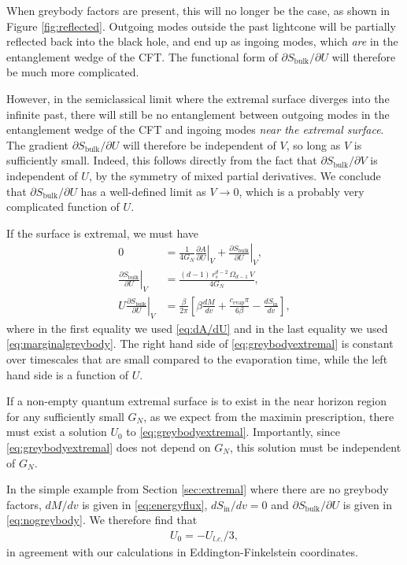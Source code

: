 \documentclass[12pt]{article}
\begin{document}
When greybody factors are present, this will no longer be the case, as shown in Figure \ref{fig:reflected}. Outgoing modes outside the past lightcone will be partially reflected back into the black hole, and end up as ingoing modes, which \emph{are} in the entanglement wedge of the CFT. The functional form of $\partial S_\text{bulk}/\partial U$ will therefore be much more complicated. 

However, in the semiclassical limit where the extremal surface diverges into the infinite past, there will still be no entanglement between outgoing modes in the entanglement wedge of the CFT and ingoing modes \emph{near the extremal surface}. The gradient $\partial S_\text{bulk}/\partial U$ will therefore be independent of $V$, so long as $V$ is sufficiently small. Indeed, this follows directly from the fact that $\partial S_\text{bulk}/\partial V$ is independent of $U$, by the symmetry of mixed partial derivatives. We conclude that $\partial S_\text{bulk}/\partial U$ has a well-defined limit as $V \to 0$, which is a probably very complicated function of $U$.

If the surface is extremal, we must have
\begin{align}
0 &=\frac{1}{4 G_N} \left. \frac{\partial A}{\partial U} \right|_V + \left. \frac{\partial S_\text{bulk}}{\partial U} \right|_V,
\\  \left. \frac{\partial S_\text{bulk}}{\partial U} \right|_V & = \frac{(d-1)\, r_s^{d-2} \,\Omega_{d-1}\, V}{4 G_N},
\\ U \left. \frac{\partial S_\text{bulk}}{\partial U} \right|_V &= \frac{\beta}{2\pi}\left[\beta \frac{d M}{d v} + \frac{c_\text{evap} \pi}{6 \beta} - \frac{d S_\text{in}}{d v}\right], \label{eq:greybodyextremal}
\end{align}
where in the first equality we used \eqref{eq:dA/dU} and in the last equality we used \eqref{eq:marginalgreybody}. The right hand side of \eqref{eq:greybodyextremal} is constant over timescales that are small compared to the evaporation time, while the left hand side is a function of $U$. 

If a non-empty quantum extremal surface is to exist in the near horizon region for any sufficiently small $G_N$, as we expect from the maximin prescription, there must exist a solution $U_0$ to \eqref{eq:greybodyextremal}. Importantly, since \eqref{eq:greybodyextremal} does not depend on $G_N$, this solution must be independent of $G_N$.
 
 In the simple example from Section \ref{sec:extremal} where there are no greybody factors, $dM/dv$ is given in \eqref{eq:energyflux}, $dS_\text{in}/dv = 0$ and  $\partial S_\text{bulk}/\partial U$ is given in \eqref{eq:nogreybody}. We therefore find that
 \begin{align}
 U_0 = -U_{l.c.}/3,
 \end{align}
in agreement with our calculations in Eddington-Finkelstein coordinates.
\end{document}
